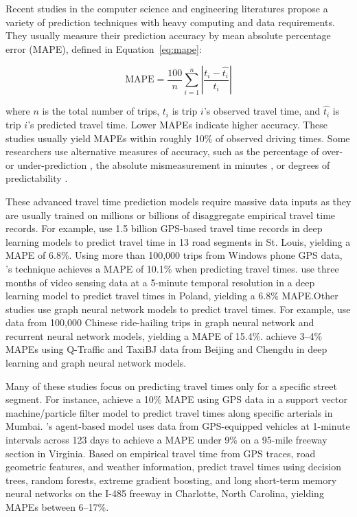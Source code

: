 \documentclass[12pt,letterpaper]{article} %
\begin{document}
Recent studies in the computer science and engineering literatures propose a variety of prediction techniques with heavy computing and data requirements. They usually measure their prediction accuracy by mean absolute percentage error (MAPE), defined in Equation~\ref{eq:mape}:

\begin{equation}
\label{eq:mape}
\text{MAPE} = \frac{100}{n} \sum^{n}_{i=1} \left|\frac{t_i - \hat{t_i}}{t_i}\right|
\end{equation}

where $n$ is the total number of trips, $t_i$ is trip $i$'s observed travel time, and $\hat{t_i}$ is trip $i$'s predicted travel time. Lower MAPEs indicate higher accuracy.  These studies usually yield MAPEs within roughly 10\% of observed driving times. Some researchers use alternative measures of accuracy, such as the percentage of over- or under-prediction \citep{jenelius2013travel}, the absolute mismeasurement in minutes \citep{chiabaut2021traffic}, or degrees of predictability \citep{li2019travel}.

These advanced travel time prediction models require massive data inputs as they are usually trained on millions or billions of disaggregate empirical travel time records. For example, \citet{hou2018network} use 1.5 billion GPS-based travel time records in deep learning models to predict travel time in 13 road segments in St. Louis, yielding a MAPE of 6.8\%. Using more than 100,000 trips from Windows phone GPS data, \citet{woodard2017predicting}'s technique achieves a MAPE of 10.1\% when predicting travel times. \citet{pamula2023estimation} use three months of video sensing data at a 5-minute temporal resolution in a deep learning model to predict travel times in Poland, yielding a 6.8\% MAPE.\@ Other studies use graph neural network models to predict travel times. For example, \citet{wang2023dynamic} use data from 100,000 Chinese ride-hailing trips in graph neural network and recurrent neural network models, yielding a MAPE of 15.4\%. \citet{vankdoth2023deep} achieve 3--4\% MAPEs using Q-Traffic and TaxiBJ data from Beijing and Chengdu in deep learning and graph neural network models.

Many of these studies focus on predicting travel times only for a specific street segment. For instance, \citet{sharmila2019svm} achieve a 10\% MAPE using GPS data in a support vector machine/particle filter model to predict travel times along specific arterials in Mumbai. \citet{chen2016multi}'s agent-based model uses data from GPS-equipped vehicles at 1-minute intervals across 123 days to achieve a MAPE under 9\% on a 95-mile freeway section in Virginia. Based on empirical travel time from GPS traces, road geometric features, and weather information, \citet{qiu2021machine} predict travel times using decision trees, random forests, extreme gradient boosting, and long short-term memory neural networks on the I-485 freeway in Charlotte, North Carolina, yielding MAPEs between 6--17\%.
\end{document}
